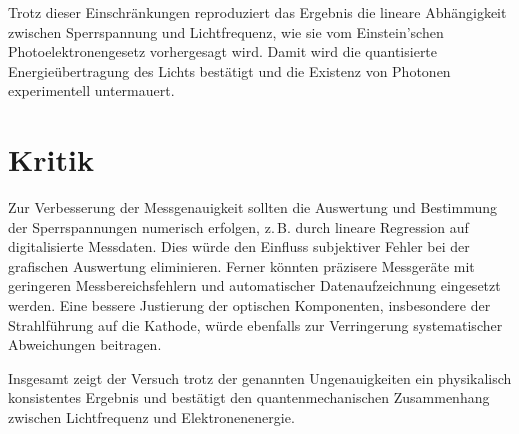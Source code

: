 Trotz dieser Einschränkungen reproduziert das Ergebnis die lineare Abhängigkeit zwischen Sperrspannung und Lichtfrequenz, wie sie vom Einstein’schen Photoelektronengesetz vorhergesagt wird.  
Damit wird die quantisierte Energieübertragung des Lichts bestätigt und die Existenz von Photonen experimentell untermauert.

\section{Kritik}

Zur Verbesserung der Messgenauigkeit sollten die Auswertung und Bestimmung der Sperrspannungen numerisch erfolgen, z.\,B. durch lineare Regression auf digitalisierte Messdaten.  
Dies würde den Einfluss subjektiver Fehler bei der grafischen Auswertung eliminieren.  
Ferner könnten präzisere Messgeräte mit geringeren Messbereichsfehlern und automatischer Datenaufzeichnung eingesetzt werden.  
Eine bessere Justierung der optischen Komponenten, insbesondere der Strahlführung auf die Kathode, würde ebenfalls zur Verringerung systematischer Abweichungen beitragen.  

Insgesamt zeigt der Versuch trotz der genannten Ungenauigkeiten ein physikalisch konsistentes Ergebnis und bestätigt den quantenmechanischen Zusammenhang zwischen Lichtfrequenz und Elektronenenergie.
